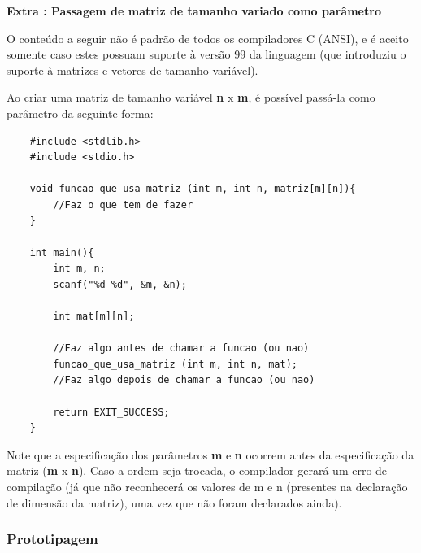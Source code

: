\documentclass[12pt]{article}
\newcommand\tab[1][1cm]{\hspace*{#1}}
\begin{document}
\hspace{0.30cm}
\par\tab\textbf{Extra : Passagem de matriz de tamanho variado como parâmetro}

\hspace{0.25cm}
\begin{tcolorbox}[colback=yellow!5!white,colframe=yellow!75!black,title=Atenção!]
  \par\tab O conteúdo a seguir não é padrão de todos os compiladores C (ANSI), e é aceito somente caso estes possuam suporte à versão 99 da linguagem (que introduziu o suporte à matrizes e vetores de tamanho variável).
\end{tcolorbox}

\par\tab Ao criar uma matriz de tamanho variável \textbf{n} x \textbf{m}, é possível passá-la como parâmetro da seguinte forma:

\hspace{0.25cm}
\begin{lstlisting}
    #include <stdlib.h>
    #include <stdio.h>
    
    void funcao_que_usa_matriz (int m, int n, matriz[m][n]){
        //Faz o que tem de fazer
    }
    
    int main(){
        int m, n;
        scanf("%d %d", &m, &n);
        
        int mat[m][n];
        
        //Faz algo antes de chamar a funcao (ou nao)
        funcao_que_usa_matriz (int m, int n, mat);
        //Faz algo depois de chamar a funcao (ou nao)
        
        return EXIT_SUCCESS;
    }
\end{lstlisting}

\hspace{0.25cm}
\begin{tcolorbox}[colback=yellow!5!white,colframe=yellow!75!black,title=Atenção!]
  \par\tab Note que a especificação dos parâmetros \textbf{m} e \textbf{n} ocorrem antes da especificação da matriz (\textbf{m} x \textbf{n}). Caso a ordem seja trocada, o compilador gerará um erro de compilação (já que não reconhecerá os valores de m e n (presentes na declaração de dimensão da matriz), uma vez que não foram declarados ainda).
\end{tcolorbox}

\subsubsection{Prototipagem}
\end{document}
